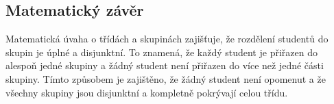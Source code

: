 \subsection*{Matematický závěr}

Matematická úvaha o třídách a skupinách zajišťuje, že rozdělení studentů do skupin je úplné a disjunktní. To znamená, že každý student je přiřazen do alespoň jedné skupiny a žádný student není přiřazen do více než jedné části skupiny. Tímto způsobem je zajištěno, že žádný student není opomenut a že všechny skupiny jsou disjunktní a kompletně pokrývají celou třídu.

